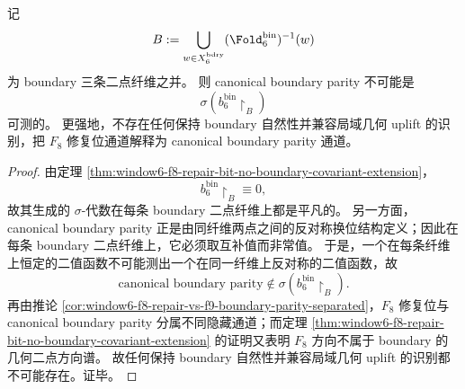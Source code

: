 \begin{theorem}\label{thm:conclusion-window6-boundary-parity-not-measurable-from-f8}
记
\[
B:=\bigcup_{w\in X_6^{\mathrm{bdry}}}(\Fold_6^{\mathrm{bin}})^{-1}(w)
\]
为 boundary 三条二点纤维之并。
则 canonical boundary parity 不可能是
\[
\sigma\!\left(b_6^{\mathrm{bin}}\!\restriction_B\right)
\]
可测的。
更强地，不存在任何保持 boundary 自然性并兼容局域几何 uplift 的识别，把 \(F_8\) 修复位通道解释为 canonical boundary parity 通道。
\end{theorem}
\begin{proof}
由定理 \ref{thm:window6-f8-repair-bit-no-boundary-covariant-extension}，
\[
b_6^{\mathrm{bin}}\!\restriction_B\equiv 0,
\]
故其生成的 \(\sigma\)-代数在每条 boundary 二点纤维上都是平凡的。
另一方面，canonical boundary parity 正是由同纤维两点之间的反对称换位结构定义；因此在每条 boundary 二点纤维上，它必须取互补值而非常值。
于是，一个在每条纤维上恒定的二值函数不可能测出一个在同一纤维上反对称的二值函数，故
\[
\text{canonical boundary parity}\notin \sigma\!\left(b_6^{\mathrm{bin}}\!\restriction_B\right).
\]
再由推论 \ref{cor:window6-f8-repair-vs-f9-boundary-parity-separated}，\(F_8\) 修复位与 canonical boundary parity 分属不同隐藏通道；而定理 \ref{thm:window6-f8-repair-bit-no-boundary-covariant-extension} 的证明又表明 \(F_8\) 方向不属于 boundary 的几何二点方向谱。
故任何保持 boundary 自然性并兼容局域几何 uplift 的识别都不可能存在。证毕。
\end{proof}







